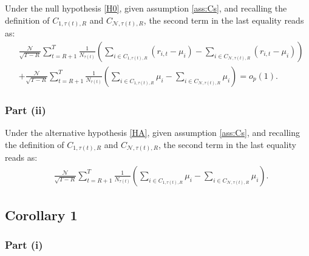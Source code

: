 Under the null hypothesis \ref{H0}, given assumption \ref{ass:Cs}, and recalling the definition of $C_{1,\tau(t),R}$ and $C_{\mathcal{N},\tau(t),R}$, the second term in the last equality reads as:
\begin{align*}
    &\frac{\mathcal{N}}{\sqrt{T-R}}\sum_{t=R+1}^{T}\frac{1}{N_{\tau(t)}} \left( \sum_{i \in C_{1,\tau(t),R}} \left( r_{i,t} - \mu_i \right) - \sum_{i \in C_{\mathcal{N},\tau(t),R}} \left( r_{i,t} - \mu_i \right) \right) \\
    &+\frac{\mathcal{N}}{\sqrt{T-R}}\sum_{t=R+1}^{T}\frac{1}{N_{\tau(t)}} \left(\sum_{i \in C_{1,\tau(t),R}}  \mu_i - \sum_{i \in C_{\mathcal{N},\tau(t),R}} \mu_i \right) = o_p(1).
\end{align*}

\subsubsection{Part (ii)}

Under the alternative hypothesis \ref{HA}, given assumption \ref{ass:Cs}, and recalling the definition of $C_{1,\tau(t),R}$ and $C_{\mathcal{N},\tau(t),R}$, the second term in the last equality reads as:
\begin{align*}
    &\frac{\mathcal{N}}{\sqrt{T-R}}\sum_{t=R+1}^{T}\frac{1}{N_{\tau(t)}} \left(\sum_{i \in C_{1,\tau(t),R}}  \mu_i - \sum_{i \in C_{\mathcal{N},\tau(t),R}} \mu_i \right).
\end{align*}



\subsection{Corollary 1}
\label{Proof of cor:error}

\subsubsection{Part (i)}

